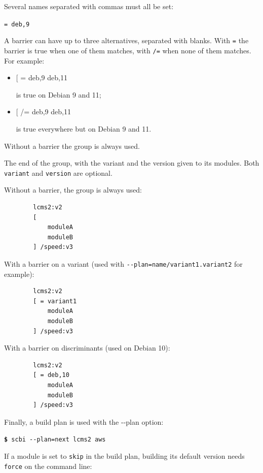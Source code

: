 \documentclass[a4paper,12pt,twoside]{article}
\newcommand{\code}[1]{\texttt{#1}}
\newcommand{\cmd}[1]{\tabto{1cm}\hspace{0.5cm}\texttt{\textbf{\$} #1}}
\newcommand{\ddash}{-{}-}
\begin{document}
\begin{description}
\begin{description}
		Several names separated with commas must all be set:

		\code{= deb,9}

		A barrier can have up to three alternatives, separated with blanks. With \code{=} the barrier is true when one of them matches, with \code{/=} when none of them matches. For example:

		\begin{itemize}
		\item {[} = deb,9 deb,11

		is true on Debian 9 and 11;

		\item {[} /= deb,9 deb,11

		is true everywhere but on Debian 9 and 11.

		\end{itemize}

		Without a barrier the group is always used.

		\item[ {]} /variant:version ] The end of the group, with the variant and the version given to its modules. Both \code{variant} and \code{version} are optional.
	\end{description}

	Without a barrier, the group is always used:

	\begin{lstlisting}
		lcms2:v2
		[
			moduleA
			moduleB
		] /speed:v3
	\end{lstlisting}

	With a barrier on a variant (used with \code{\ddash{}plan=name/variant1.variant2} for example):

	\begin{lstlisting}
		lcms2:v2
		[ = variant1
			moduleA
			moduleB
		] /speed:v3
	\end{lstlisting}

	With a barrier on discriminants (used on Debian 10):

	\begin{lstlisting}
		lcms2:v2
		[ = deb,10
			moduleA
			moduleB
		] /speed:v3
	\end{lstlisting}
\end{description}

Finally, a build plan is used with the \ddash{}plan option:

\cmd{scbi \ddash{}plan=next lcms2 aws}

If a module is set to \code{skip} in the build plan, building its default version needs \code{force} on the command line:
\end{document}

